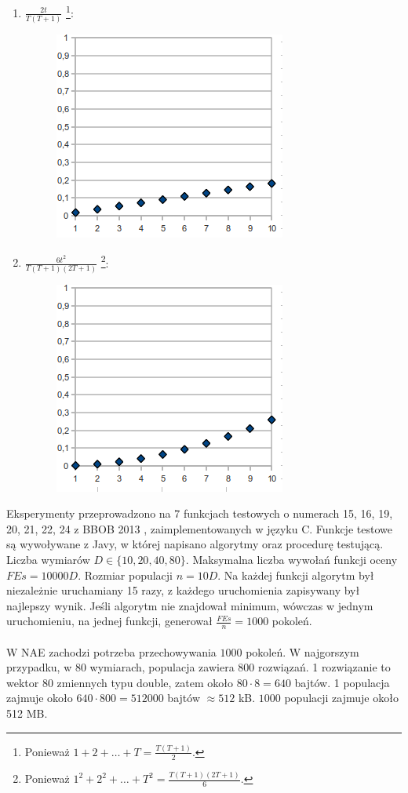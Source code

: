 \documentclass[12pt, a4paper]{article}
\begin{document}
\begin{enumerate}
\begin{figure}[H]
  \end{figure}
 \item $\frac{2t}{T(T+1)}$
\footnote{Ponieważ $1 + 2 + \dots + T = \frac{T(T+1)}{2}$.}:
  \begin{figure}[H]
  \centering
  \includegraphics[scale=0.5]{img/4.png} 
  \end{figure}
 \item $\frac{6t^2}{T(T+1)(2T+1)}$
\footnote{Ponieważ $1^2 + 2^2 + \dots + T^2 = \frac{T(T+1)(2T+1)}{6}$.}:
  \begin{figure}[H]
  \centering
  \includegraphics[scale=0.5]{img/5.png} 
  \end{figure}
\end{enumerate}
Eksperymenty przeprowadzono na 7 funkcjach testowych o numerach 15, 16, 19, 20, 21, 22, 24 z BBOB 2013 \cite{finck, hansen}, 
zaimplementowanych w języku C.
Funkcje testowe są wywoływane z Javy, w której napisano algorytmy oraz procedurę testującą.
Liczba wymiarów $D \in \{10, 20, 40, 80\}$. Maksymalna liczba wywołań funkcji oceny $FEs = 10000D$. 
Rozmiar populacji $n = 10D$. 
Na każdej funkcji algorytm był niezależnie uruchamiany 15 razy, z każdego uruchomienia zapisywany był najlepszy wynik.
Jeśli algorytm nie znajdował minimum, wówczas w jednym uruchomieniu, na jednej funkcji, 
generował $\frac{FEs}{n} = 1000$ pokoleń. \\
\\
W NAE zachodzi potrzeba przechowywania $1000$ pokoleń. W najgorszym przypadku, w 80 wymiarach, populacja zawiera 800 rozwiązań.
1 rozwiązanie to wektor 80 zmiennych typu double, zatem około $80\cdot8=640$ bajtów. 
1 populacja zajmuje około $640\cdot800 = 512000$ bajtów $\approx 512$ kB. 
$1000$ populacji zajmuje około 512 MB. \\
\end{document}

